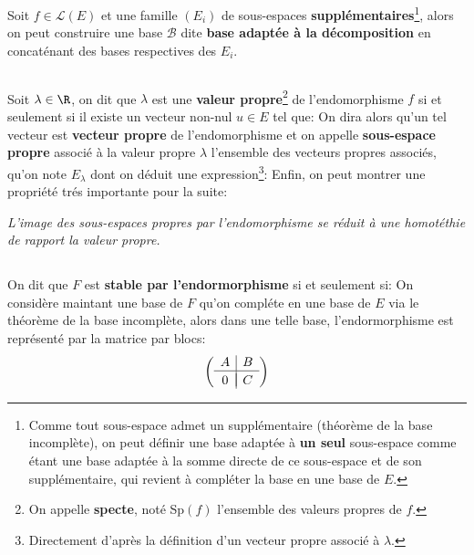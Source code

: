 Soit \(f \in \mathcal{L}(E)\) et une famille \((E_i)\) de sous-espaces \textbf{supplémentaires}\footnote[1]{Comme tout sous-espace admet un supplémentaire (théorème de la base incomplète), on peut définir une base adaptée à \textbf{un seul} sous-espace comme étant une base adaptée à la somme directe de ce sous-espace et de son supplémentaire, qui revient à compléter la base en une base de \(E\).}, alors on peut construire une base \(\mathcal{B}\) dite \textbf{base adaptée à la décomposition} en concaténant des bases respectives des \(E_i\).

\subsection*{}
Soit \(\lambda \in \R\), on dit que \(\lambda\) est une \textbf{valeur propre}\footnote[2]{On appelle \textbf{specte}, noté Sp\((f)\) l'ensemble des valeurs propres de \(f\).} de l'endomorphisme \(f\) si et seulement si il existe un vecteur non-nul \(u \in E\) tel que:
On dira alors qu'un tel vecteur est \textbf{vecteur propre} de l'endomorphisme et on appelle \textbf{sous-espace propre} associé à la valeur propre \(\lambda\) l'ensemble des vecteurs propres associés, qu'on note \(E_\lambda\) dont on déduit une expression\footnote[3]{Directement d'après la définition d'un vecteur propre associé à \(\lambda\).}:
Enfin, on peut montrer une propriété trés importante pour la suite:
\begin{center}
   \textit{L'image des sous-espaces propres par l'endomorphisme se réduit à une homotéthie de rapport la valeur propre.}
\end{center}

\subsection*{}
On dit que \(F\) est \textbf{stable par l'endormorphisme} si et seulement si:
On considère maintant une base de \(F\) qu'on compléte en une base de \(E\) via le théorème de la base incomplète, alors dans une telle base, l'endormorphisme est représenté par la matrice par blocs:
\[
   \left(\begin{array}{c|c}
      A & B\\
      \hline\\[-1.7\medskipamount]
      0 & C
   \end{array}\right)
\]
\pagebreak

